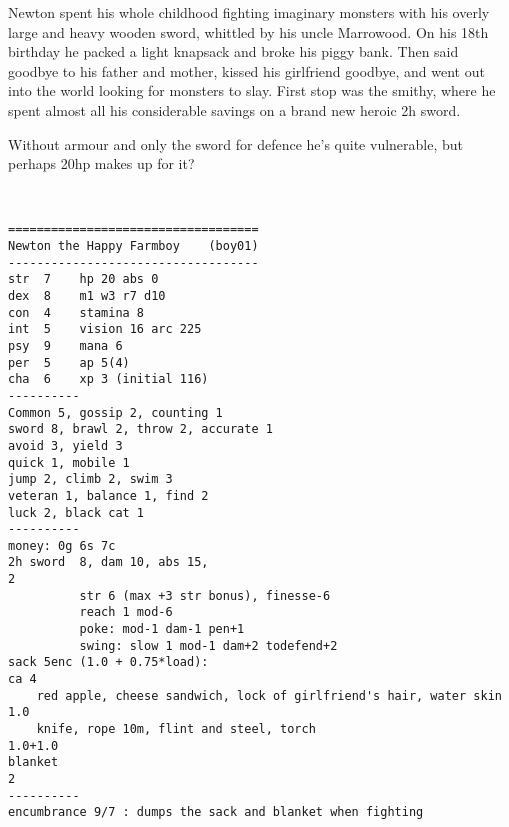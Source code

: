 \clearpage
\begin{samepage}

\noindent Newton spent his whole childhood fighting imaginary monsters with his overly large and heavy wooden sword, whittled by his uncle Marrowood. On his 18th birthday he packed a light knapsack and broke his piggy bank. Then said goodbye to his father and mother, kissed his girlfriend goodbye, and went out into the world looking for monsters to slay. First stop was the smithy, where he spent almost all his considerable savings on a brand new heroic 2h sword.

Without armour and only the sword for defence he's quite vulnerable, but perhaps 20hp makes up for it?

\

\small \begin{verbatim}
===================================
Newton the Happy Farmboy    (boy01)
-----------------------------------
str  7    hp 20 abs 0
dex  8    m1 w3 r7 d10
con  4    stamina 8
int  5    vision 16 arc 225
psy  9    mana 6
per  5    ap 5(4)
cha  6    xp 3 (initial 116)
----------
Common 5, gossip 2, counting 1
sword 8, brawl 2, throw 2, accurate 1
avoid 3, yield 3
quick 1, mobile 1
jump 2, climb 2, swim 3
veteran 1, balance 1, find 2
luck 2, black cat 1
----------
money: 0g 6s 7c
2h sword  8, dam 10, abs 15,                                                   2
          str 6 (max +3 str bonus), finesse-6
          reach 1 mod-6
          poke: mod-1 dam-1 pen+1
          swing: slow 1 mod-1 dam+2 todefend+2
sack 5enc (1.0 + 0.75*load):                                                ca 4
    red apple, cheese sandwich, lock of girlfriend's hair, water skin    1.0
    knife, rope 10m, flint and steel, torch                          1.0+1.0
blanket                                                                        2
----------
encumbrance 9/7 : dumps the sack and blanket when fighting
\end{verbatim} \end{samepage} \normalsize



















